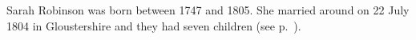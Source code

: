 
Sarah Robinson was born between 1747 and 1805.\cite{GeniSarahCoppin}
She married  around on 22 July 1804 in Gloustershire\cite{GeniSarahCoppin}
and they had seven children (see p.~\pageref{William_Coppin}).
